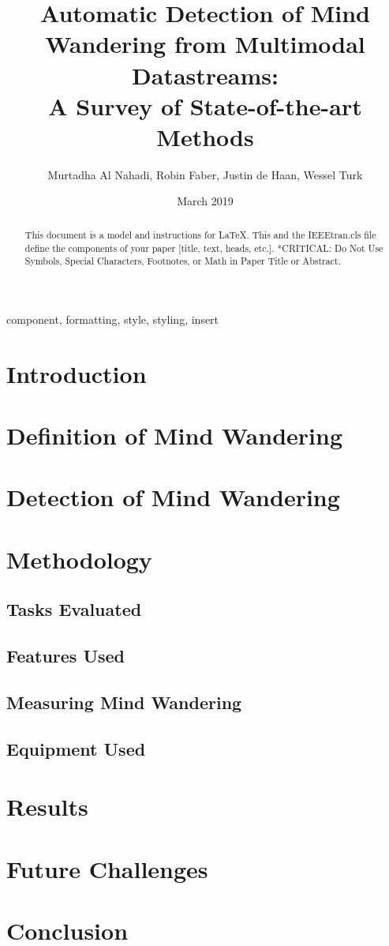 \documentclass[conference]{IEEEtran}
\title{Automatic Detection of Mind Wandering from Multimodal Datastreams:\\ 
A Survey of State-of-the-art Methods}
\author{Murtadha Al Nahadi, Robin Faber, Justin de Haan, Wessel Turk}
\date{March 2019}
\begin{document}
\maketitle
\begin{abstract}
    This document is a model and instructions for \LaTeX.
    This and the IEEEtran.cls file define the components of your paper [title, text, heads, etc.]. *CRITICAL: Do Not Use Symbols, Special Characters, Footnotes, 
    or Math in Paper Title or Abstract.
    \end{abstract}
    
    \begin{IEEEkeywords}
    component, formatting, style, styling, insert
    \end{IEEEkeywords}


\section{Introduction}


\section{Definition of Mind Wandering}

\section{Detection of Mind Wandering}

\section{Methodology}

\subsection{Tasks Evaluated}

\subsection{Features Used}

\subsection{Measuring Mind Wandering}

\subsection{Equipment Used}

\section{Results}

\section{Future Challenges}


\section{Conclusion}

\printbibliography
\end{document}
